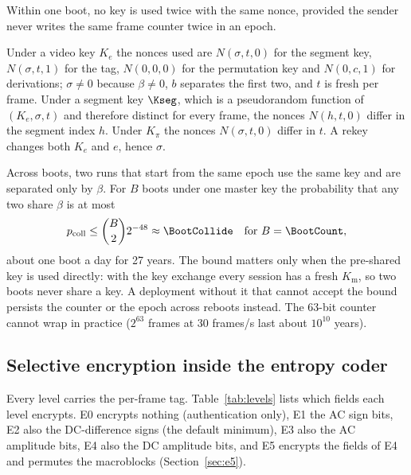 \begin{proposition}\label{prop:nonce}
Within one boot, no key is used twice with the same nonce, provided the sender never writes the same frame counter twice in an epoch.
\end{proposition}
\begin{IEEEproof}
Under a video key $K_e$ the nonces used are $N(\sigma, t, 0)$ for the segment key, $N(\sigma, t, 1)$ for the tag, $N(0, 0, 0)$ for the permutation key and $N(0, c, 1)$ for derivations; $\sigma \ne 0$ because $\beta \ne 0$, $b$ separates the first two, and $t$ is fresh per frame. Under a segment key $\Kseg$, which is a pseudorandom function of $(K_e, \sigma, t)$ and therefore distinct for every frame, the nonces $N(h, t, 0)$ differ in the segment index $h$. Under $K_\pi$ the nonces $N(\sigma, t, 0)$ differ in $t$. A rekey changes both $K_e$ and $e$, hence $\sigma$.
\end{IEEEproof}
Across boots, two runs that start from the same epoch use the same key and are separated only by $\beta$. For $B$ boots under one master key the probability that any two share $\beta$ is at most
\begin{equation}
p_{\mathrm{coll}} \le \binom{B}{2} 2^{-48} \approx \BootCollide \quad \text{for } B = \BootCount,
\label{eq:boot}
\end{equation}
about one boot a day for 27 years. The bound matters only when the pre-shared key is used directly: with the key exchange every session has a fresh $K_{\mathrm{m}}$, so two boots never share a key. A deployment without it that cannot accept the bound persists the counter or the epoch across reboots instead. The 63-bit counter cannot wrap in practice ($2^{63}$ frames at 30 frames/s last about $10^{10}$ years).

\subsection{Selective encryption inside the entropy coder}\label{sec:selenc}
Every level carries the per-frame tag. Table~\ref{tab:levels} lists which fields each level encrypts. E0 encrypts nothing (authentication only), E1 the AC sign bits, E2 also the DC-difference signs (the default minimum), E3 also the AC amplitude bits, E4 also the DC amplitude bits, and E5 encrypts the fields of E4 and permutes the macroblocks (Section~\ref{sec:e5}).

